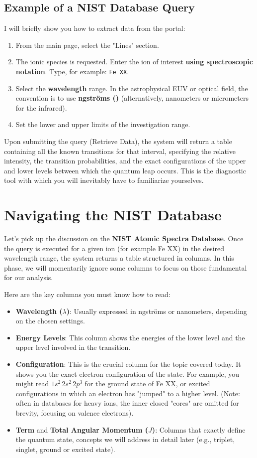 \subsection{Example of a NIST Database Query}

I will briefly show you how to extract data from the portal:
\begin{enumerate}
\item From the main page, select the "Lines" section.
\item The ionic species is requested. Enter the ion of interest \textbf{using spectroscopic notation}. Type, for example: \texttt{Fe XX}.
\item Select the \textbf{wavelength} range. In the astrophysical EUV or optical field, the convention is to use \textbf{\text{\AA}ngströms (\text{\AA})} (alternatively, nanometers or micrometers for the infrared).
\item Set the lower and upper limits of the investigation range.
\end{enumerate}
Upon submitting the query (Retrieve Data), the system will return a table containing all the known transitions for that interval, specifying the relative intensity, the transition probabilities, and the exact configurations of the upper and lower levels between which the quantum leap occurs. This is the diagnostic tool with which you will inevitably have to familiarize yourselves.

\section{Navigating the NIST Database}

Let's pick up the discussion on the \textbf{NIST Atomic Spectra Database}. Once the query is executed for a given ion (for example Fe XX) in the desired wavelength range, the system returns a table structured in columns.
In this phase, we will momentarily ignore some columns to focus on those fundamental for our analysis.

Here are the key columns you must know how to read:
\begin{itemize}
\item \textbf{Wavelength ($\lambda$)}: Usually expressed in \text{\AA}ngströms or nanometers, depending on the chosen settings.
\item \textbf{Energy Levels}: This column shows the energies of the lower level and the upper level involved in the transition.
\item \textbf{Configuration}: This is the crucial column for the topic covered today. It shows you the exact electron configuration of the state. For example, you might read $1s^2\, 2s^2\, 2p^3$ for the ground state of Fe XX, or excited configurations in which an electron has "jumped" to a higher level. (Note: often in databases for heavy ions, the inner closed "cores" are omitted for brevity, focusing on valence electrons).
\item \textbf{Term} and \textbf{Total Angular Momentum ($J$)}: Columns that exactly define the quantum state, concepts we will address in detail later (e.g., triplet, singlet, ground or excited state).
\end{itemize}

